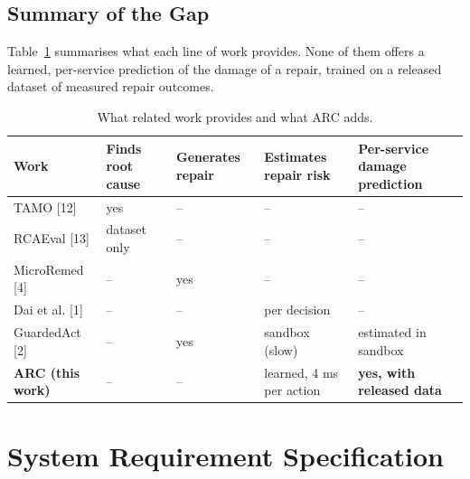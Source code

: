 \documentclass[12pt,a4paper]{report}
\begin{document}
\section{Summary of the Gap}
Table~\ref{tab:gap} summarises what each line of work provides. None of them offers a learned, per-service prediction of the damage of a repair, trained on a released dataset of measured repair outcomes.

\begin{table}[H]
\centering
\caption{What related work provides and what ARC adds.}
\label{tab:gap}
\small
\begin{tabularx}{\textwidth}{>{\raggedright\arraybackslash}p{3.1cm}XXXX}
\toprule
Work & Finds root cause & Generates repair & Estimates repair risk & Per-service damage prediction \\
\midrule
TAMO [12] & yes & -- & -- & -- \\
RCAEval [13] & dataset only & -- & -- & -- \\
MicroRemed [4] & -- & yes & -- & -- \\
Dai et al. [1] & -- & -- & per decision & -- \\
GuardedAct [2] & -- & yes & sandbox (slow) & estimated in sandbox \\
\textbf{ARC (this work)} & -- & -- & learned, 4 ms per action & \textbf{yes, with released data} \\
\bottomrule
\end{tabularx}
\end{table}

\chapter{System Requirement Specification}
\end{document}

